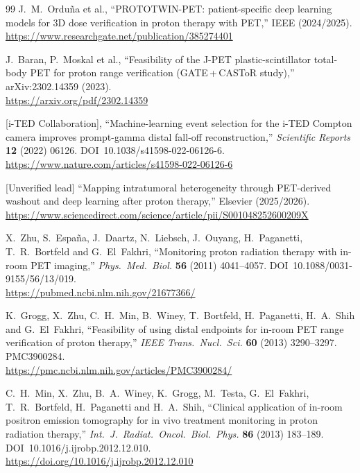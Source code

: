 \documentclass[11pt]{article}
\begin{document}
\begin{thebibliography}{99}
J.~M.~Ordu\~na et al.,
``PROTOTWIN-PET: patient-specific deep learning models for 3D dose verification
in proton therapy with PET,''
IEEE (2024/2025).\\
\url{https://www.researchgate.net/publication/385274401}

J.~Baran, P.~Moskal et al.,
``Feasibility of the J-PET plastic-scintillator total-body PET for proton range
verification (GATE\,+\,CASToR study),''
arXiv:2302.14359 (2023).\\
\url{https://arxiv.org/pdf/2302.14359}

[i-TED Collaboration],
``Machine-learning event selection for the i-TED Compton camera improves
prompt-gamma distal fall-off reconstruction,''
\textit{Scientific Reports} \textbf{12} (2022) 06126.
DOI~10.1038/s41598-022-06126-6.\\
\url{https://www.nature.com/articles/s41598-022-06126-6}

[Unverified lead]
``Mapping intratumoral heterogeneity through PET-derived washout and deep
learning after proton therapy,''
Elsevier (2025/2026).\\
\url{https://www.sciencedirect.com/science/article/pii/S001048252600209X}


X.~Zhu, S.~Espa\~na, J.~Daartz, N.~Liebsch, J.~Ouyang, H.~Paganetti,
T.~R.~Bortfeld and G.~El~Fakhri,
``Monitoring proton radiation therapy with in-room PET imaging,''
\textit{Phys.\ Med.\ Biol.} \textbf{56} (2011) 4041--4057.
DOI~10.1088/0031-9155/56/13/019.\\
\url{https://pubmed.ncbi.nlm.nih.gov/21677366/}

K.~Grogg, X.~Zhu, C.~H.~Min, B.~Winey, T.~Bortfeld, H.~Paganetti, H.~A.~Shih and
G.~El~Fakhri,
``Feasibility of using distal endpoints for in-room PET range verification of
proton therapy,''
\textit{IEEE Trans.\ Nucl.\ Sci.} \textbf{60} (2013) 3290--3297. PMC3900284.\\
\url{https://pmc.ncbi.nlm.nih.gov/articles/PMC3900284/}

C.~H.~Min, X.~Zhu, B.~A.~Winey, K.~Grogg, M.~Testa, G.~El~Fakhri, T.~R.~Bortfeld,
H.~Paganetti and H.~A.~Shih,
``Clinical application of in-room positron emission tomography for in vivo
treatment monitoring in proton radiation therapy,''
\textit{Int.\ J.\ Radiat.\ Oncol.\ Biol.\ Phys.} \textbf{86} (2013) 183--189.
DOI~10.1016/j.ijrobp.2012.12.010.\\
\url{https://doi.org/10.1016/j.ijrobp.2012.12.010}


\end{thebibliography}
\end{document}

